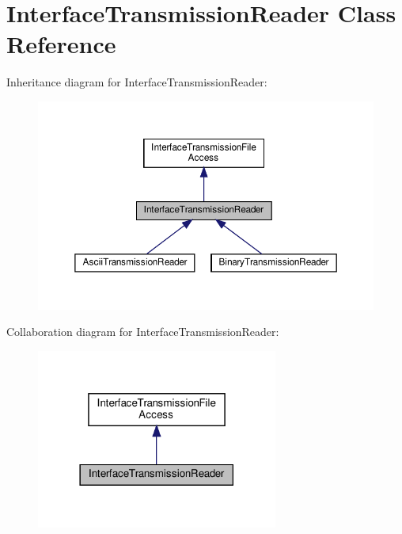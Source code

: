\hypertarget{classInterfaceTransmissionReader}{}\section{Interface\+Transmission\+Reader Class Reference}
\label{classInterfaceTransmissionReader}


Inheritance diagram for Interface\+Transmission\+Reader\+:\nopagebreak
\begin{figure}[H]
\begin{center}
\leavevmode
\includegraphics[width=350pt]{d1/dce/classInterfaceTransmissionReader__inherit__graph}
\end{center}
\end{figure}


Collaboration diagram for Interface\+Transmission\+Reader\+:\nopagebreak
\begin{figure}[H]
\begin{center}
\leavevmode
\includegraphics[width=225pt]{db/d1d/classInterfaceTransmissionReader__coll__graph}
\end{center}
\end{figure}
